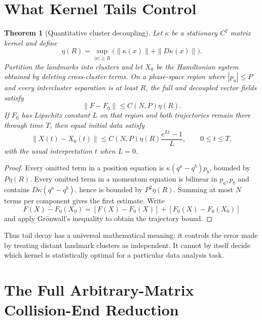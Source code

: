 \documentclass[11pt]{article}
\newtheorem{theorem}{Theorem}
\begin{document}
\section*{What Kernel Tails Control}

\begin{theorem}[Quantitative cluster decoupling]
\label{thm:tails}
Let \(\kappa\) be a stationary \(C^2\) matrix kernel and define
\[
 \eta(R)=\sup_{|x|\ge R}
 \bigl(\|\kappa(x)\|+\|D\kappa(x)\|\bigr).
\]
Partition the landmarks into clusters and let \(X_0\) be the Hamiltonian
system obtained by deleting cross-cluster terms.  On a phase-space region
where \(|p_a|\le P\) and every intercluster separation is at least \(R\),
the full and decoupled vector fields satisfy
\[
 \|F-F_0\|\le C(N,P)\eta(R).
\]
If \(F_0\) has Lipschitz constant \(L\) on that region and both trajectories
remain there through time \(T\), then equal initial data satisfy
\[
 \|X(t)-X_0(t)\|
 \le C(N,P)\eta(R)\frac{e^{Lt}-1}{L},
 \qquad 0\le t\le T,
\]
with the usual interpretation \(t\) when \(L=0\).
\end{theorem}

\begin{proof}
Every omitted term in a position equation is
\(\kappa(q^a-q^b)p_b\), bounded by \(P\eta(R)\).  Every omitted term in a
momentum equation is bilinear in \(p_a,p_b\) and contains
\(D\kappa(q^a-q^b)\), hence is bounded by \(P^2\eta(R)\).  Summing at most
\(N\) terms per component gives the first estimate.  Write
\[
 F(X)-F_0(X_0)=[F(X)-F_0(X)]+[F_0(X)-F_0(X_0)]
\]
and apply Gr\"onwall's inequality to obtain the trajectory bound.
\end{proof}

Thus tail decay has a universal mathematical meaning: it controls the error
made by treating distant landmark clusters as independent.  It cannot by
itself decide which kernel is statistically optimal for a particular data
analysis task.

\section*{The Full Arbitrary-Matrix Collision-End Reduction}
\end{document}
